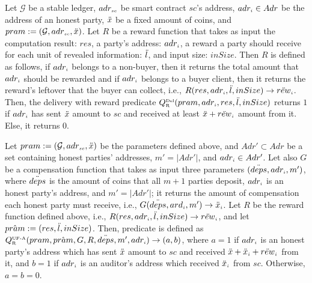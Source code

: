     \begin{definition}   Let $\mathcal{G}$ be a stable ledger, $adr_{\scriptscriptstyle sc}$ be smart contract $sc$'s address, $adr_{\scriptscriptstyle i}\in Adr$ be the address of an honest party, $\ddot{x}$ be a fixed amount of coins, and $pram:=(\mathcal{G}, adr_{\scriptscriptstyle sc}, \ddot{x})$. Let $R$ be a reward function that takes as input the computation result: $res$, a party's address: $adr_{\scriptscriptstyle i}$, a reward a party should receive for each unit of revealed information:  $\ddot{l}$, and input size: $inSize$.  Then $R$ is defined as follows, if $adr_{\scriptscriptstyle i}$ belongs to a non-buyer, then it returns the total amount that $adr_{\scriptscriptstyle i}$ should be rewarded and if $adr_{\scriptscriptstyle i}$ belongs to a buyer client, then it returns the reward's leftover that the buyer can collect, i.e., $R(res, adr_{\scriptscriptstyle i}, \ddot{l}, inSize)\rightarrow \ddot{rew}_{\scriptscriptstyle i}$.    Then, the delivery with reward predicate $Q^{\scriptscriptstyle \text{Del}}_{\scriptscriptstyle\text{R}}(pram,  adr_{\scriptscriptstyle i}, res, \ddot{l}, inSize)$ returns $1$ if $adr_{\scriptscriptstyle i}$ has sent $\ddot{x}$ amount to $sc$ and received at least $\ddot{x}+\ddot{rew}_{\scriptscriptstyle i}$ amount from it. Else, it returns $0$. 
    
    
    

  \end{definition}





   \begin{definition}  
 Let $pram:=(\mathcal{G}, adr_{\scriptscriptstyle sc}, \ddot{x})$ be the parameters defined above, and $Adr'\subset Adr$ be a set containing honest parties' addresses, $m' = |Adr'|$,  and   $adr_{\scriptscriptstyle i}\in Adr'$. Let also $G$ be a compensation function that takes as input  three parameters $(\ddot{deps}, adr_{\scriptscriptstyle i}, m')$, where $\ddot{deps}$ is the amount of coins that all $m+1$ parties deposit, $adr_{\scriptscriptstyle i}$ is an honest party's address, and $m' = |Adr'|$; it returns the amount of compensation each honest party must receive, i.e., $G(\ddot{deps}, ard_{\scriptscriptstyle i}, m')\rightarrow \ddot{x}_{\scriptscriptstyle i}$. Let $R$ be the reward function defined above, i.e., $R(res, adr_{\scriptscriptstyle i}, \ddot{l}, inSize)\rightarrow \ddot{rew}_{\scriptscriptstyle i}$, and let $\hat {pram}:=(res, \ddot{l}, inSize)$.  Then, predicate \qUnFAbtwr is defined as $Q^{\scriptscriptstyle \text{UF-A}}_{\scriptscriptstyle \text{R}}(pram, \hat {pram}, G, R, \ddot{deps}, m', adr_{\scriptscriptstyle i})\rightarrow (a,b)$, where $a=1$ if $adr_{\scriptscriptstyle i}$ is an honest party's address which has sent $\ddot{x}$ amount to $sc$ and received  $\ddot{x}+\ddot{x}_{\scriptscriptstyle i}+\ddot{rew}_{\scriptscriptstyle i}$  from it, and $b=1$ if $adr_{\scriptscriptstyle i}$ is an auditor's address which received $\ddot{x}_{\scriptscriptstyle i}$  from $sc$. Otherwise, $a=b=0$. 
  \end{definition}

